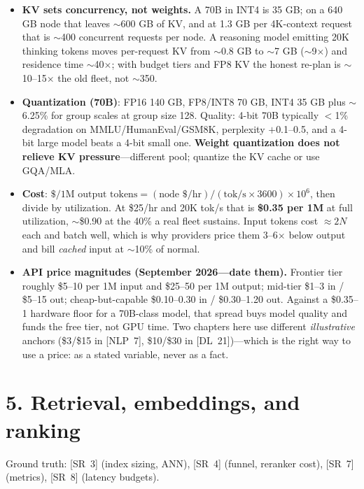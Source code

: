\begin{itemize}[leftmargin=*,itemsep=1pt]
\item \textbf{KV sets concurrency, not weights.} A 70B in INT4 is 35 GB; on a
640 GB node that leaves $\sim$600 GB of KV, and at 1.3 GB per 4K-context request
that is $\sim$400 concurrent requests per node. A reasoning model emitting 20K
thinking tokens moves per-request KV from $\sim$0.8 GB to $\sim$7 GB
($\sim$9$\times$) and residence time $\sim$40$\times$; with budget tiers and FP8
KV the honest re-plan is $\sim$10--15$\times$ the old fleet, not $\sim$350.
\item \textbf{Quantization (70B)}: FP16 140 GB, FP8/INT8 70 GB, INT4 35 GB plus
$\sim$6.25\% for group scales at group size 128. Quality: 4-bit 70B typically
$<$1\% degradation on MMLU/HumanEval/GSM8K, perplexity $+$0.1--0.5, and a 4-bit
large model beats a 4-bit small one. \textbf{Weight quantization does not
relieve KV pressure}---different pool; quantize the KV cache or use GQA/MLA.
\item \textbf{Cost}: $\$/\text{1M output tokens} = (\text{node \$/hr}) /
(\text{tok/s} \times 3600) \times 10^{6}$, then divide by utilization. At
\$25/hr and 20K tok/s that is \textbf{\$0.35 per 1M} at full utilization,
$\sim$\$0.90 at the 40\% a real fleet sustains. Input tokens cost $\approx 2N$
each and batch well, which is why providers price them 3--6$\times$ below output
and bill \emph{cached} input at $\sim$10\% of normal.
\item \textbf{API price magnitudes (September 2026---date them).} Frontier tier
roughly \$5--10 per 1M input and \$25--50 per 1M output; mid-tier \$1--3 in /
\$5--15 out; cheap-but-capable \$0.10--0.30 in / \$0.30--1.20 out. Against a
\$0.35--1 hardware floor for a 70B-class model, that spread buys model quality
and funds the free tier, not GPU time. Two chapters here use different
\emph{illustrative} anchors (\$3/\$15 in [NLP~7], \$10/\$30 in [DL~21])---which
is the right way to use a price: as a stated variable, never as a fact.
\end{itemize}

\section*{5. Retrieval, embeddings, and ranking}

\noindent Ground truth: [SR~3] (index sizing, ANN), [SR~4] (funnel, reranker
cost), [SR~7] (metrics), [SR~8] (latency budgets).

